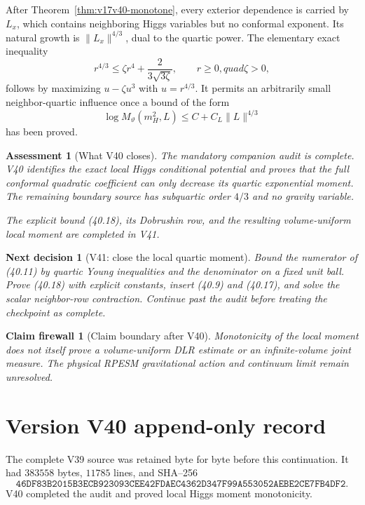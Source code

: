 \documentclass[11pt]{article}
\newtheorem{firewall}[theorem]{Claim firewall}
\newtheorem{decision}[theorem]{Next decision}
\newtheorem{assessment}[theorem]{Assessment}
\theoremstyle{remark}
\begin{document}
After Theorem~\ref{thm:v17v40-monotone}, every exterior dependence is
carried by \(L_x\), which contains neighboring Higgs variables but no
conformal exponent.  Its natural growth is \(\|L_x\|^{4/3}\), dual to
the quartic power.  The elementary exact inequality
\[
 r^{4/3}\leq\zeta r^4+
 \frac{2}{3\sqrt{3\zeta}},
 \qquad r\geq0,quad\zeta>0,                       \tag{40.17}
\]
follows by maximizing \(u-\zeta u^3\) with
\(u=r^{4/3}\).  It permits an arbitrarily small neighbor-quartic
influence once a bound of the form
\[
 \log M_\vartheta(m_H^2,L)
 \leq C+C_L\|L\|^{4/3}                            \tag{40.18}
\]
has been proved.

\begin{assessment}[What V40 closes]
\label{ass:v17v40-status}
The mandatory companion audit is complete.  V40 identifies the exact
local Higgs conditional potential and proves that the full conformal
quadratic coefficient can only decrease its quartic exponential moment.
The remaining boundary source has subquartic order \(4/3\) and no
gravity variable.

The explicit bound (40.18), its Dobrushin row, and the resulting
volume-uniform local moment are completed in V41.
\end{assessment}

\begin{decision}[V41: close the local quartic moment]
\label{dec:v17v40-next}
Bound the numerator of (40.11) by quartic Young inequalities and the
denominator on a fixed unit ball.  Prove (40.18) with explicit constants,
insert (40.9) and (40.17), and solve the scalar neighbor-row contraction.
Continue past the audit before treating the checkpoint as complete.
\end{decision}

\begin{firewall}[Claim boundary after V40]
\label{fire:v17v40}
Monotonicity of the local moment does not itself prove a volume-uniform
DLR estimate or an infinite-volume joint measure.  The physical RPESM
gravitational action and continuum limit remain unresolved.
\end{firewall}

\section*{Version V40 append-only record}
The complete V39 source was retained byte for byte before this
continuation.  It had \(383558\) bytes, \(11785\) lines, and SHA--256
\[
 \texttt{46DF83B2015B3ECB923093CEE42FDAEC4362D347F99A553052AEBE2CE7FB4DF2}.
\]
V40 completed the audit and proved local Higgs moment monotonicity.
\end{document}
